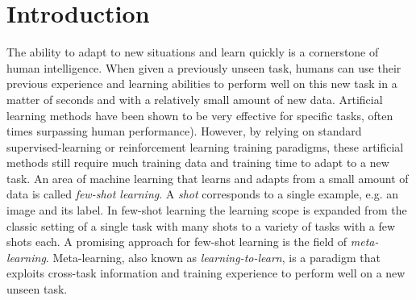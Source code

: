 
\vspace{-2em}

\section{Introduction}
The ability to adapt to new situations and learn quickly is a cornerstone of human intelligence. When given a previously unseen task, humans can use their previous experience and learning abilities to perform well on this new task in a matter of seconds and with a relatively small amount of new data. Artificial learning methods have been shown to be very effective for specific tasks, often times surpassing human performance\supercite{alphago,dermato}). However, by relying on standard supervised-learning or reinforcement learning training paradigms, these artificial methods still require much training data and training time to adapt to a new task.
%
An area of machine learning that learns and adapts from a small amount of data is called \textit{few-shot learning}\supercite{fei2006one}. A \textit{shot} corresponds to a single example, e.g. an image and its label. In few-shot learning the learning scope is expanded from the classic setting of a single task with many shots to a variety of tasks with a few shots each. A promising approach for few-shot learning is the field of \textit{meta-learning}. Meta-learning, also known as \textit{learning-to-learn}, is a paradigm that exploits cross-task information and training experience to perform well on a new unseen task.\\

